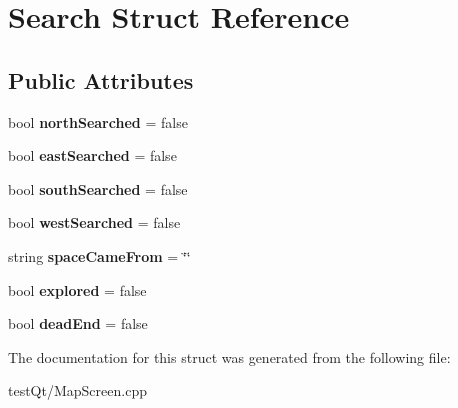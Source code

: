 \hypertarget{struct_search}{}\section{Search Struct Reference}
\label{struct_search}
\subsection*{Public Attributes}
\begin{DoxyCompactItemize}
\item 
\hypertarget{struct_search_a87992fbf082d7d1bb6095fc645df7337}{}\label{struct_search_a87992fbf082d7d1bb6095fc645df7337} 
bool {\bfseries north\+Searched} = false
\item 
\hypertarget{struct_search_a258093c1b694f7be1cd3bd96f9e08f5c}{}\label{struct_search_a258093c1b694f7be1cd3bd96f9e08f5c} 
bool {\bfseries east\+Searched} = false
\item 
\hypertarget{struct_search_ad00469a5393f6d7627042da1d31fc56a}{}\label{struct_search_ad00469a5393f6d7627042da1d31fc56a} 
bool {\bfseries south\+Searched} = false
\item 
\hypertarget{struct_search_a14328c1d137d9608f6382309a47676a4}{}\label{struct_search_a14328c1d137d9608f6382309a47676a4} 
bool {\bfseries west\+Searched} = false
\item 
\hypertarget{struct_search_aecab176131f37e3751f5dfb5d62b1207}{}\label{struct_search_aecab176131f37e3751f5dfb5d62b1207} 
string {\bfseries space\+Came\+From} = \char`\"{}\char`\"{}
\item 
\hypertarget{struct_search_aac7791842d53dca0b23f4bf23fd2796d}{}\label{struct_search_aac7791842d53dca0b23f4bf23fd2796d} 
bool {\bfseries explored} = false
\item 
\hypertarget{struct_search_a37e87cd6ae0c7e02715e4cdd57af2015}{}\label{struct_search_a37e87cd6ae0c7e02715e4cdd57af2015} 
bool {\bfseries dead\+End} = false
\end{DoxyCompactItemize}


The documentation for this struct was generated from the following file\+:\begin{DoxyCompactItemize}
\item 
test\+Qt/Map\+Screen.\+cpp\end{DoxyCompactItemize}
